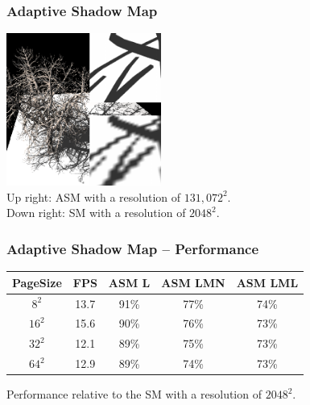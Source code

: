 \documentclass[xcolor={usenames,dvipsnames}]{beamer}
\begin{document}
\begin{frame}[t]
  \frametitle{Adaptive Shadow Map}
  \begin{center}
    \includegraphics[height=5cm]{img/asm} \\
    Up right: ASM with a resolution of $131,072^2$. \\
    Down right: SM with a resolution of $2048^2$.
  \end{center}
\end{frame}

\begin{frame}
  \frametitle{Adaptive Shadow Map -- Performance}
  \begin{center}
    \begin{tabular}{c c c c c}
      PageSize & FPS & ASM L & ASM LMN & ASM LML \\\hline
      $8^2$ & 13.7 & 91\% & 77\% & 74\% \\
      $16^2$ & 15.6 & 90\% & 76\% & 73\% \\
      $32^2$ & 12.1 & 89\% & 75\% & 73\% \\
      $64^2$ & 12.9 & 89\% & 74\% & 73\% \\
    \end{tabular} \vspace{9mm}

    Performance relative to the SM with a resolution of $2048^2$.
  \end{center}
\end{frame}
\end{document}
